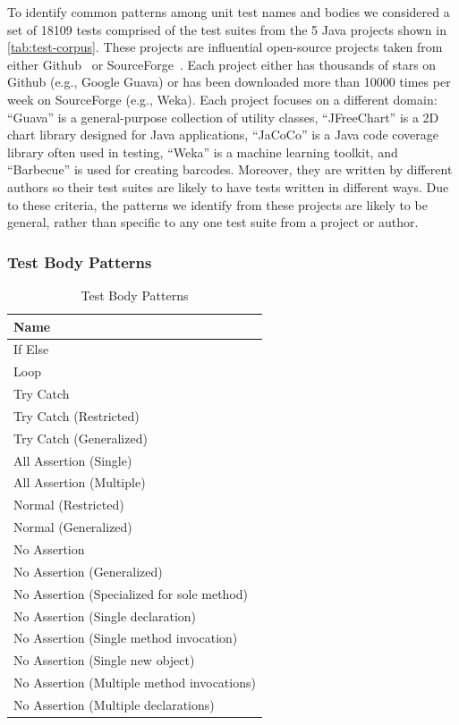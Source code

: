 \documentclass[proposal.tex]{subfiles}
\begin{document}
To identify common patterns among unit test names and bodies we considered a set of \num{18109} tests comprised of the test suites from the \num{5} Java projects shown in \cref{tab:test-corpus}.
%
These projects are influential open-source projects taken from either Github~\cite{github} or SourceForge~\cite{sourceforge}.
%
Each project either has thousands of stars on Github (e.g., Google Guava) or has been downloaded more than \num{10000} times per week on SourceForge (e.g., Weka).
%
Each project focuses on a different domain: \enquote{Guava} is a general-purpose collection of utility classes, \enquote{JFreeChart} is a 2D chart library designed for Java applications, \enquote{JaCoCo} is a Java code coverage library often used in testing, \enquote{Weka} is a machine learning toolkit, and \enquote{Barbecue} is used for creating barcodes.
% 
Moreover, they are written by different authors so their test suites are likely to have tests written in different ways.
%
Due to these criteria, the patterns we identify from these projects are likely to be general, rather than specific to any one test suite from a project or author.


\subsubsection{Test Body Patterns}
\label{sec:body-patterns}

\begin{table}[t]
\scriptsize
\centering
\caption{Test Body Patterns}
\begin{tabular}{l} 
\toprule
\textbf{Name} \\
\midrule
If Else  \\
Loop  \\
Try Catch  \\
Try Catch (Restricted) \\
Try Catch (Generalized) \\
All Assertion (Single) \\
All Assertion (Multiple) \\
Normal (Restricted) \\
Normal (Generalized) \\
No Assertion \\
No Assertion (Generalized) \\
No Assertion (Specialized for sole method) \\
No Assertion (Single declaration) \\
No Assertion (Single method invocation) \\
No Assertion (Single new object) \\
No Assertion (Multiple method invocations) \\
No Assertion (Multiple declarations) \\
\bottomrule
\end{tabular}
\label{tab:body-patterns}
\end{table}
\end{document}
